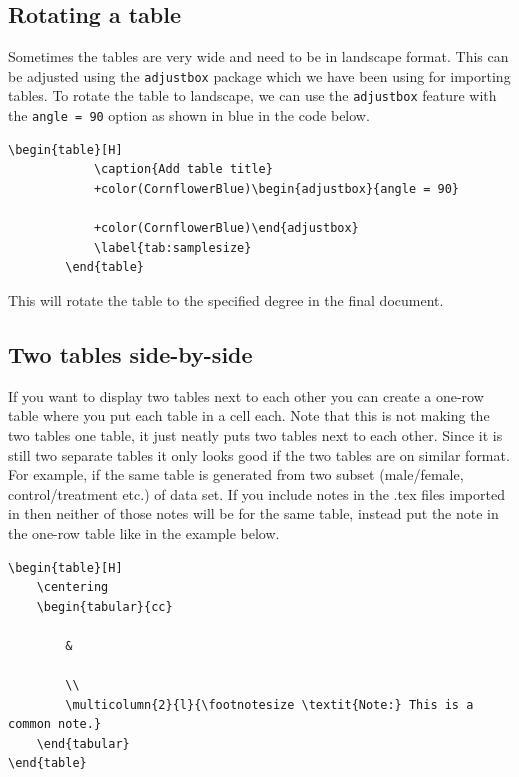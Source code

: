 \documentclass[12pts]{article}
\begin{document}
	\subsection{Rotating a table}
	
	Sometimes the tables are very wide and need to be in landscape format. This can be adjusted using the \texttt{adjustbox} package which we have been using for importing tables. To rotate the table to landscape, we can use the \texttt{adjustbox} feature with the \texttt{angle = 90} option as shown in blue in the code below.
	
	\begin{minipage}{\textwidth}
		\begin{Verbatim}[commandchars=+\(\)]
		\begin{table}[H]
			\caption{Add table title}
			+color(CornflowerBlue)\begin{adjustbox}{angle = 90} 
				
			+color(CornflowerBlue)\end{adjustbox}
			\label{tab:samplesize}
		\end{table}
		\end{Verbatim}
	\end{minipage}
	
	This will rotate the table to the specified degree in the final document. 
	
	\subsection{Two tables side-by-side}

	If you want to display two tables next to each other you can create a one-row table where you put each table in a cell each. Note that this is not making the two tables one table, it just neatly puts two tables next to each other. Since it is still two separate tables it only looks good if the two tables are on similar format. For example, if the same table is generated from two subset (male/female, control/treatment etc.) of data set. If you include notes in the .tex files imported in \verb|| then neither of those notes will be for the same table, instead put the note in the one-row table like in the example below.
	
\begin{minipage}{\textwidth}
	\begin{Verbatim}[commandchars=+\(\)]
\begin{table}[H]
	\centering
	\begin{tabular}{cc}
		
		&
		
		\\
		\multicolumn{2}{l}{\footnotesize \textit{Note:} This is a common note.}
	\end{tabular}
\end{table}
	\end{Verbatim}
\end{minipage} 	
	
\end{document}
